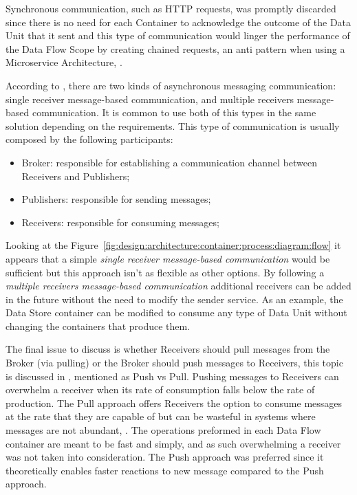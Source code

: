 Synchronous communication, such as HTTP requests, was promptly discarded since there is no need for each Container to acknowledge the outcome of the Data Unit that it sent and this type of communication would linger the performance of the Data Flow Scope by creating chained requests, an anti pattern when using a Microservice Architecture, \cite{microsoftmicroanti}.

According to \cite{microsoftasync}, there are two kinds of asynchronous messaging communication: single receiver message-based communication, and multiple receivers message-based communication. It is common to use both of this types in the same solution depending on the requirements. This type of communication is usually composed by the following participants:

\begin{itemize}
   \item Broker: responsible for establishing a communication channel between Receivers and Publishers;
   \item Publishers: responsible for sending messages;
   \item Receivers: responsible for consuming messages;
\end{itemize}

Looking at the Figure~\ref{fig:design:architecture:container:process:diagram:flow} it appears that a simple \textit{single receiver message-based communication} would be sufficient but this approach isn't as flexible as other options. By following a \textit{multiple receivers message-based communication} additional receivers can be added in the future without the need to modify the sender service. As an example, the Data Store container can be modified to consume any type of Data Unit without changing the containers that produce them.

The final issue to discuss is whether Receivers should pull messages from the Broker (via pulling) or the Broker should push messages to Receivers, this topic is discussed in , mentioned as Push vs Pull. Pushing messages to Receivers can overwhelm a receiver when its rate of consumption falls below the rate of production. The Pull approach offers Receivers the option to consume messages at the rate that they are capable of but can be wasteful in systems where messages are not abundant, \cite{pubsubpushpullrab}. The operations preformed in each Data Flow container are meant to be fast and simply, and as such overwhelming a receiver was not taken into consideration. The Push approach was preferred since it theoretically enables faster reactions to new message compared to the Push approach.

